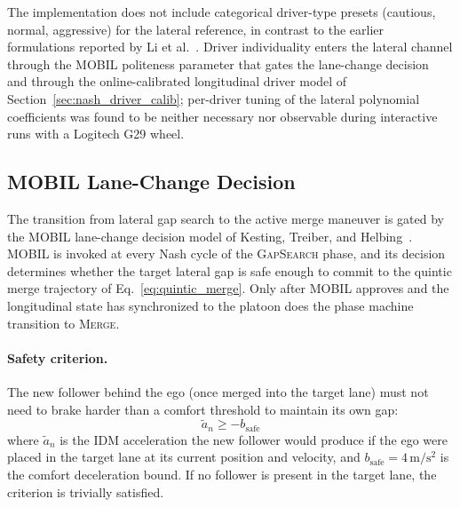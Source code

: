 \documentclass[12pt,a4paper,oneside]{report}
\begin{document}
The implementation does not include categorical driver-type presets (cautious, normal, aggressive) for the lateral reference, in contrast to the earlier formulations reported by Li et al.~\cite{liSharedControlNovel2019}. Driver individuality enters the lateral channel through the MOBIL politeness parameter that gates the lane-change decision~\cite{kestingGeneralLaneChangingModel2007} and through the online-calibrated longitudinal driver model of Section~\ref{sec:nash_driver_calib}; per-driver tuning of the lateral polynomial coefficients was found to be neither necessary nor observable during interactive runs with a Logitech G29 wheel.

\subsection{MOBIL Lane-Change Decision}
\label{sec:mobil_decision}

The transition from lateral gap search to the active merge maneuver is gated by the MOBIL lane-change decision model of Kesting, Treiber, and Helbing~\cite{kestingGeneralLaneChangingModel2007, kestingMOBILGeneralLaneChanging}. MOBIL is invoked at every Nash cycle of the \textsc{GapSearch} phase, and its decision determines whether the target lateral gap is safe enough to commit to the quintic merge trajectory of Eq.~\eqref{eq:quintic_merge}. Only after MOBIL approves and the longitudinal state has synchronized to the platoon does the phase machine transition to \textsc{Merge}.

\paragraph{Safety criterion.} The new follower behind the ego (once merged into the target lane) must not need to brake harder than a comfort threshold to maintain its own gap:
\begin{equation}
\tilde{a}_n \geq -b_{\text{safe}}
\label{eq:mobil_safety}
\end{equation}
where $\tilde{a}_n$ is the IDM acceleration the new follower would produce if the ego were placed in the target lane at its current position and velocity, and $b_{\text{safe}} = 4\,\mathrm{m/s^2}$ is the comfort deceleration bound. If no follower is present in the target lane, the criterion is trivially satisfied.
\end{document}
